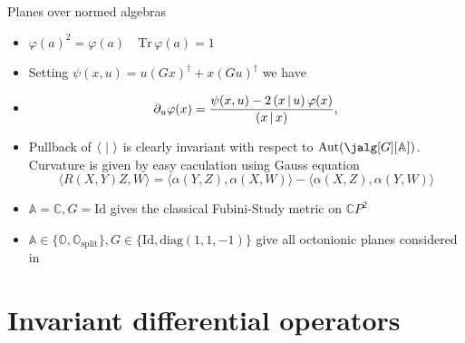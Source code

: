 \documentclass[10pt]{beamer}
\begin{document}
\begin{frame}{Planes over normed algebras}
\begin{itemize}[<+- | alert@+>]
	\item $\varphi(a)^2 = \varphi(a) \quad \mathrm{Tr}\, \varphi (a) = 1$
	\item Setting $\psi(x,u) = u(Gx)^\dagger + x(Gu)^\dagger$ we have
	\item \[
\partial_u \varphi(x) = \frac{\psi(x,u) - 2\left( x \,|\, u \right)\varphi(x)}{\left( x \,|\, x \right)},
\]
	\item Pullback of $\langle \,\,|\, \, \rangle$ is clearly invariant with respect to $\mathrm{Aut}(\jalg[G][\mathbb{A}])$. Curvature is given by easy caculation using Gauss equation 
	\[
	 \langle R(X,Y)Z, W\rangle = \langle \alpha(Y,Z), \alpha(X,W)\rangle - \langle \alpha(X,Z), \alpha(Y,W)\rangle 
	\]
	
	\item $\mathbb{A} = \mathbb{C}, G = \mathrm{Id}$ gives the classical Fubini-Study metric on $\mathbb{C}P^2$
	\item $\mathbb{A} \in \{ \mathbb{O}, \mathbb{O}_\text{split} \}, G \in \{ \mathrm{Id}, \mathrm{diag}(1,1,-1)\}$ give all octonionic planes considered in \cite{held_semi-riemannian_2009}
	
\end{itemize}
\end{frame}

\section{Invariant differential operators}
\end{document}
